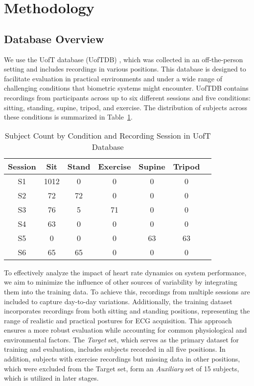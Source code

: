 \section{Methodology}
\subsection{Database Overview}
We use the UofT database (UofTDB) \cite{Wahabi2014}, which was collected in an off-the-person setting and includes recordings in various positions. This database is designed to facilitate evaluation in practical environments and under a wide range of challenging conditions that biometric systems might encounter. UofTDB contains recordings from participants across up to six different sessions and five conditions: sitting, standing, supine, tripod, and exercise. The distribution of subjects across these conditions is summarized in Table~\ref{tab:subject_distribution}.

\begin{table}[!t]
    \centering
    \caption{Subject Count by Condition and Recording Session in UofT Database}
    \label{tab:subject_distribution}
    \begin{tabular}{ccccccc}
        \toprule
        \textbf{Session} & \textbf{Sit} & \textbf{Stand} & \textbf{Exercise} & \textbf{Supine} & \textbf{Tripod} \\
        \midrule
        S1 & 1012 & 0   & 0  & 0  & 0   \\
        S2 & 72   & 72  & 0  & 0  & 0   \\
        S3 & 76   & 5   & 71 & 0  & 0   \\
        S4 & 63   & 0   & 0  & 0  & 0   \\
        S5 & 0    & 0   & 0  & 63 & 63  \\
        S6 & 65   & 65  & 0  & 0  & 0   \\
        \bottomrule
    \end{tabular}
\end{table}

To effectively analyze the impact of heart rate dynamics on system performance, we aim to minimize the influence of other sources of variability by integrating them into the training data.
To achieve this, recordings from multiple sessions are included to capture day-to-day variations.
Additionally, the training dataset incorporates recordings from both sitting and standing positions, representing the range of realistic and practical postures for ECG acquisition.
This approach ensures a more robust evaluation while accounting for common physiological and environmental factors.
The \textit{Target} set, which serves as the primary dataset for training and evaluation, includes subjects recorded in all five positions.
In addition, subjects with exercise recordings but missing data in other positions, which were excluded from the Target set, form an \textit{Auxiliary} set of 15 subjects, which is utilized in later stages.

